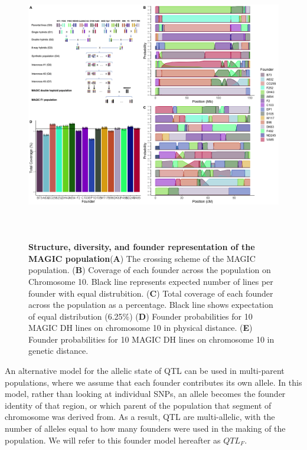 \documentclass[article,9pt,twocolumn,twoside]{rilabRxiv}
\newcommand{\der}{{\textcolor{purple}{X}}}
\begin{document}
\begin{figure}[ht!]
\centering
\includegraphics[width=\textwidth,height=12cm]{figures/Methods_Fig1.png}
\caption{\textbf{Structure, diversity, and founder representation of the MAGIC population}(\textbf{A}) The crossing scheme of the MAGIC population. (\textbf{B}) Coverage of each founder across the population on Chromosome 10. Black line represents expected number of lines per founder with equal distrubition. (\textbf{C}) Total coverage of each founder across the population as a percentage. Black line shows expectation of equal distribution (6.25\%)  (\textbf{D}) Founder probabilities for 10 MAGIC DH lines on chromosome 10 in physical distance. (\textbf{E}) Founder probabilities for 10 MAGIC DH lines on chromosome 10 in genetic distance.}
\label{fig:figure1}
\end{figure}

An alternative model for the allelic state of QTL can be used in multi-parent populations, where we assume that each founder contributes its own allele.
In this model, rather than looking at individual SNPs, an allele becomes the founder identity of that region, or which parent of the population that segment of chromosome was derived from.
As a result, QTL are multi-allelic, with the number of alleles equal to how many founders were used in the making of the population.
We will refer to this founder model hereafter as $QTL_F$.
\end{document}
